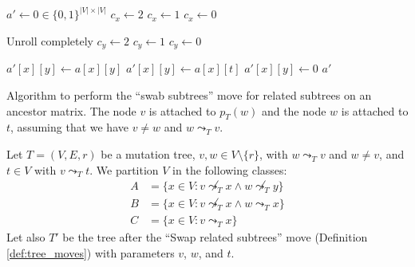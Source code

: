 \begin{algorithm}
    \begin{algorithmic}[1]
        \State $a' \leftarrow 0 \in \{0,1\}^{|V| \times |V|}$
                \State $c_x \leftarrow 2$
                \State $c_x \leftarrow 1$
            \Else
                \State $c_x \leftarrow 0$
            \EndIf

             \Comment Unroll completely
                    \State $c_y \leftarrow 2$
                    \State $c_y \leftarrow 1$
                \Else
                    \State $c_y \leftarrow 0$
                \EndIf

                    \State $a'[x][y] \leftarrow a[x][y]$
                    \State $a'[x][y] \leftarrow a[x][t]$
                \Else
                    \State $a'[x][y] \leftarrow 0$
                \EndIf
            \EndFor
        \EndFor
        \State \Return $a'$
        \EndFunction
    \end{algorithmic}
    \caption{Algorithm to perform the ``swab subtrees'' move for related subtrees on an ancestor matrix. The node $v$ is attached to $p_T(w)$ and the node $w$ is attached to $t$, assuming that we have $v \neq w$ and $w \leadsto_T v$.}
    \label{alg:am_swap_related}
\end{algorithm}

\begin{definition}
    \label{def:related_swap_classes}
    Let $T = (V, E, r)$ be a mutation tree, $v,w \in V \setminus \{r\}$, with $w \leadsto_T v$ and $w \neq v$, and $t \in V$ with $v \leadsto_T t$. We partition $V$ in the following classes:
    \begin{align*}
      A &= \{x \in V: v \not\leadsto_T x \wedge w \not\leadsto_T y\} \\
      B &= \{x \in V: v \not\leadsto_T x \wedge w \leadsto_T x\} \\
      C &= \{x \in V: v \leadsto_T x\}
    \end{align*}
    Let also $T'$ be the tree after the ``Swap related subtrees'' move (Definition \ref{def:tree_moves}) with parameters $v$, $w$, and $t$.
\end{definition}

